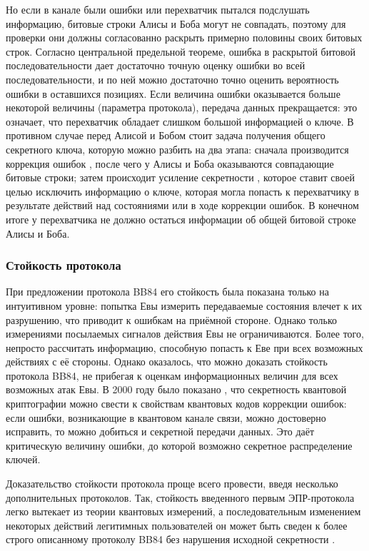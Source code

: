 Но если в канале были ошибки или перехватчик пытался подслушать информацию, битовые строки Алисы и Боба могут не совпадать, поэтому для проверки они должны согласованно раскрыть примерно половины своих битовых строк. Согласно центральной предельной теореме, ошибка в раскрытой битовой последовательности дает достаточно точную оценку ошибки во всей последовательности, и по ней можно достаточно точно оценить вероятность ошибки в оставшихся позициях. Если величина ошибки оказывается больше некоторой величины (параметра протокола), передача данных прекращается: это означает, что перехватчик обладает слишком большой информацией о ключе. В противном случае перед Алисой и Бобом стоит задача получения общего секретного ключа, которую можно разбить на два этапа: сначала производится коррекция ошибок \cite{information_reconcilation}, после чего у Алисы и Боба оказываются совпадающие битовые строки; затем происходит усиление секретности \cite{privacy_amplification}, которое ставит своей целью исключить информацию о 
ключе, которая могла попасть к перехватчику в результате действий над состояниями или в ходе коррекции ошибок. В конечном итоге у перехватчика не должно остаться информации об общей битовой строке Алисы и Боба.

\subsubsection{Стойкость протокола}
При предложении протокола BB84 его стойкость была показана только на интуитивном уровне: попытка Евы измерить передаваемые состояния влечет к их разрушению, что приводит к ошибкам на приёмной стороне.
Однако только измерениями посылаемых сигналов действия Евы не ограничиваются. Более того, непросто рассчитать информацию, способную попасть к Еве при всех возможных действиях с её стороны. Однако оказалось, что можно доказать стойкость протокола BB84, не прибегая к оценкам информационных величин для всех возможных атак Евы. В 2000 году было показано \cite{shor_bb84_security_proof}, что секретность квантовой криптографии можно свести к свойствам квантовых кодов коррекции ошибок: если ошибки, возникающие в квантовом канале связи, можно достоверно исправить, то можно добиться и секретной передачи данных. Это даёт критическую величину ошибки, до которой возможно секретное распределение ключей. 

Доказательство стойкости протокола проще всего провести, введя несколько дополнительных протоколов. Так, стойкость введенного первым ЭПР-протокола \cite{e91} легко вытекает из теории квантовых измерений, а последовательным изменением некоторых действий легитимных пользователей он может быть сведен к более строго описанному протоколу BB84 без нарушения исходной секретности \cite{lo_chau, protocol_css}.

